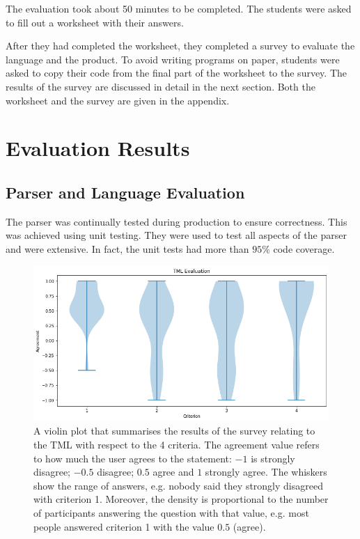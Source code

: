 The evaluation took about 50 minutes to be completed. The students were asked to fill out a worksheet with their answers. 

After they had completed the worksheet, they completed a survey to evaluate the language and the product. To avoid writing programs on paper, students were asked to copy their code from the final part of the worksheet to the survey. The results of the survey are discussed in detail in the next section. Both the worksheet and the survey are given in the appendix. 

\section{Evaluation Results}
\subsection{Parser and Language Evaluation}
The parser was continually tested during production to ensure correctness. This was achieved using unit testing. They were used to test all aspects of the parser and were extensive. In fact, the unit tests had more than $95\%$ code coverage.

\begin{figure}[htb]
    \centering
    \includegraphics[scale=0.35]{data/tml-evaluation.png}
    \caption{A violin plot that summarises the results of the survey relating to the TML with respect to the 4 criteria. The agreement value refers to how much the user agrees to the statement: $-1$ is strongly disagree; $-0.5$ disagree; $0.5$ agree and $1$ strongly agree. The whiskers show the range of answers, e.g. nobody said they strongly disagreed with criterion 1. Moreover, the density is proportional to the number of participants answering the question with that value, e.g. most people answered criterion 1 with the value $0.5$ (agree).}
    \label{fig:tml-evaluation}
\end{figure}

